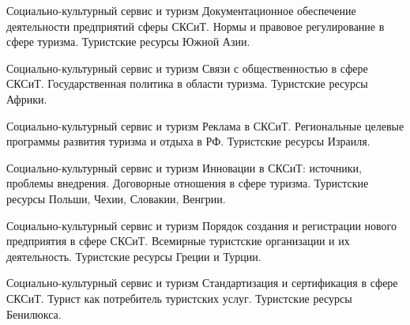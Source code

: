 \documentclass[
	11pt,
	a4paper,
	]
	{article}
\begin{document}
\begin{minipage}[t][\miniH]{\miniL}\centering
	 {Социально-культурный сервис и туризм}
		{
			Документационное обеспечение деятельности предприятий сферы СКСиТ.
		}{
			Нормы и правовое регулирование в сфере туризма.
		}{
			Туристские ресурсы Южной Азии.
		}
	\lowGE
\end{minipage}

\vfill



\begin{minipage}[t][\miniH]{\miniL}\centering
	 {Социально-культурный сервис и туризм}
		{
			Связи с общественностью в сфере СКСиТ.
		}{
			Государственная политика в области туризма.
		}{
			Туристские ресурсы Африки.
		}
	\lowGE
\end{minipage}

\vfill



\begin{minipage}[t][\miniH]{\miniL}\centering
	 {Социально-культурный сервис и туризм}
		{
			Реклама в СКСиТ.
		}{
			Региональные целевые программы развития туризма и отдыха в РФ.
		}{
			Туристские ресурсы Израиля.
		}
	\lowGE
\end{minipage}





\begin{minipage}[t][\miniH]{\miniL}\centering
	 {Социально-культурный сервис и туризм}
		{
			Инновации в СКСиТ: источники, проблемы внедрения.
		}{
			Договорные отношения в сфере туризма.
		}{
			Туристские ресурсы Польши, Чехии, Словакии, Венгрии.
		}
	\lowGE
\end{minipage}

\vfill



\begin{minipage}[t][\miniH]{\miniL}\centering
	 {Социально-культурный сервис и туризм}
		{
			Порядок создания и регистрации нового предприятия в сфере СКСиТ.
		}{
			Всемирные туристские организации и их деятельность.
		}{
			Туристские ресурсы Греции и Турции.
		}
	\lowGE
\end{minipage}

\vfill



\begin{minipage}[t][\miniH]{\miniL}\centering
	 {Социально-культурный сервис и туризм}
		{
			Стандартизация и сертификация в сфере СКСиТ.
		}{
			Турист как потребитель туристских услуг.
		}{
			Туристские ресурсы Бенилюкса.
		}
	\lowGE
\end{minipage}
\end{document}
